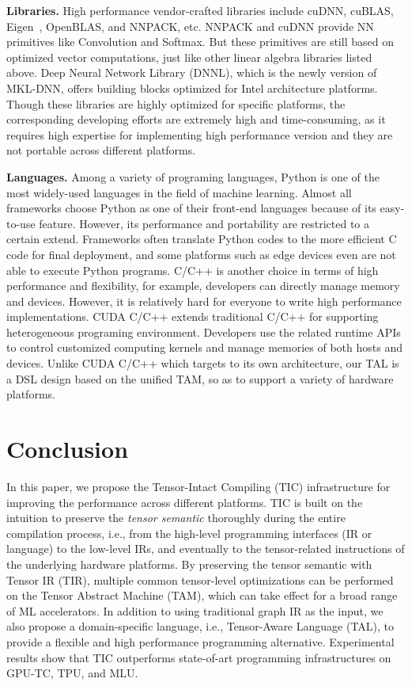 \textbf{Libraries.} High performance vendor-crafted libraries include cuDNN\cite{chetlur2014cudnn}, cuBLAS, Eigen~\cite{eigen}, OpenBLAS\cite{openblas}, and NNPACK\cite{nnpack}, etc. NNPACK and cuDNN provide NN primitives like Convolution and Softmax. But these primitives are still based on optimized vector computations, just like other linear algebra libraries listed above. Deep Neural Network Library (DNNL), which is the newly version of MKL-DNN, offers building blocks optimized for Intel architecture platforms. Though these libraries are highly optimized for specific platforms, the corresponding developing efforts are extremely high and time-consuming, as it requires high expertise for implementing high performance version and they are not portable across different platforms.

\textbf{Languages.} Among a variety of programing languages, Python is one of the most widely-used languages in the field of machine learning. Almost all frameworks choose Python as one of their front-end languages because of its easy-to-use feature. However, its performance and portability are restricted to a certain extend. Frameworks often translate Python codes to the more efficient C code for final deployment, and some platforms such as edge devices even are not able to execute Python programs. C/C++ is another choice in terms of high performance and flexibility, for example, developers can directly manage memory and devices. However, it is relatively hard for everyone to write high performance implementations. CUDA C/C++ extends traditional C/C++ for supporting heterogeneous programing environment. Developers use the related runtime APIs to control customized computing kernels and manage memories of both hosts and devices. Unlike CUDA C/C++ which targets to its own architecture, our TAL is a DSL design based on the unified TAM, so as to support a variety of hardware platforms. %

\section{Conclusion}
In this paper, we propose the Tensor-Intact Compiling (TIC) infrastructure for improving the performance across different platforms. TIC is built on the intuition to preserve the \emph{tensor semantic} thoroughly during the entire compilation process, i.e., from the high-level programming interfaces (IR or language) to the low-level IRs, and eventually to the tensor-related instructions of the underlying hardware platforms. By preserving the tensor semantic with Tensor IR (TIR), multiple common tensor-level optimizations can be performed on the Tensor Abstract Machine (TAM), which can take effect for a broad range of ML accelerators. In addition to using traditional graph IR as the input, we also propose a domain-specific language, i.e., Tensor-Aware Language (TAL), to provide a flexible and high performance programming alternative. Experimental results show that TIC outperforms state-of-art programming infrastructures on GPU-TC, TPU, and MLU.


